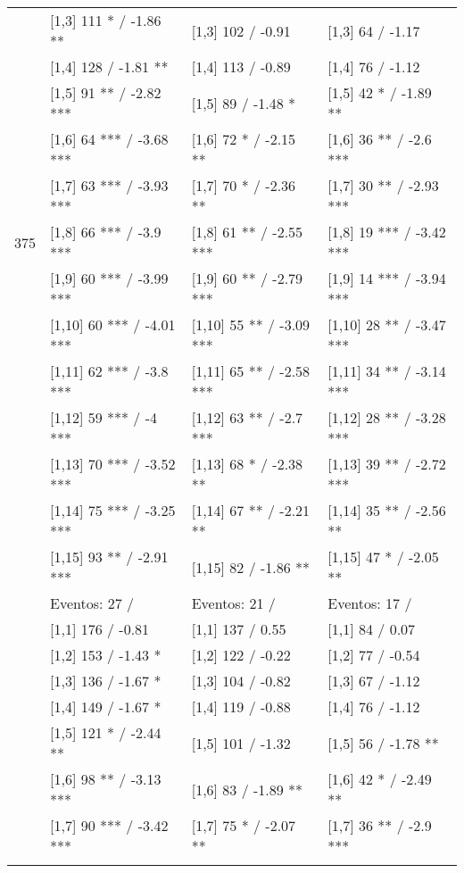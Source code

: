 \begin{table}
\begin{tabular}[t]{llll}
 & {}[1,3] 111 * / -1.86 ** & {}[1,3] 102  / -0.91 & {}[1,3] 64  / -1.17\\
\addlinespace
 & {}[1,4] 128  / -1.81 ** & {}[1,4] 113  / -0.89 & {}[1,4] 76  / -1.12\\
 & {}[1,5] 91 ** / -2.82 *** & {}[1,5] 89  / -1.48 * & {}[1,5] 42 * / -1.89 **\\
 & {}[1,6] 64 *** / -3.68 *** & {}[1,6] 72 * / -2.15 ** & {}[1,6] 36 ** / -2.6 ***\\
 & {}[1,7] 63 *** / -3.93 *** & {}[1,7] 70 * / -2.36 ** & {}[1,7] 30 ** / -2.93 ***\\
375 & {}[1,8] 66 *** / -3.9 *** & {}[1,8] 61 ** / -2.55 *** & {}[1,8] 19 *** / -3.42 ***\\
\addlinespace
 & {}[1,9] 60 *** / -3.99 *** & {}[1,9] 60 ** / -2.79 *** & {}[1,9] 14 *** / -3.94 ***\\
 & {}[1,10] 60 *** / -4.01 *** & {}[1,10] 55 ** / -3.09 *** & {}[1,10] 28 ** / -3.47 ***\\
 & {}[1,11] 62 *** / -3.8 *** & {}[1,11] 65 ** / -2.58 *** & {}[1,11] 34 ** / -3.14 ***\\
 & {}[1,12] 59 *** / -4 *** & {}[1,12] 63 ** / -2.7 *** & {}[1,12] 28 ** / -3.28 ***\\
 & {}[1,13] 70 *** / -3.52 *** & {}[1,13] 68 * / -2.38 ** & {}[1,13] 39 ** / -2.72 ***\\
\addlinespace
 & {}[1,14] 75 *** / -3.25 *** & {}[1,14] 67 ** / -2.21 ** & {}[1,14] 35 ** / -2.56 **\\
 & {}[1,15] 93 ** / -2.91 *** & {}[1,15] 82  / -1.86 ** & {}[1,15] 47 * / -2.05 **\\
 & Eventos:  27 / & Eventos:  21 / & Eventos:  17 /\\
 & {}[1,1] 176  / -0.81 & {}[1,1] 137  / 0.55 & {}[1,1] 84  / 0.07\\
 & {}[1,2] 153  / -1.43 * & {}[1,2] 122  / -0.22 & {}[1,2] 77  / -0.54\\
\addlinespace
 & {}[1,3] 136  / -1.67 * & {}[1,3] 104  / -0.82 & {}[1,3] 67  / -1.12\\
 & {}[1,4] 149  / -1.67 * & {}[1,4] 119  / -0.88 & {}[1,4] 76  / -1.12\\
 & {}[1,5] 121 * / -2.44 ** & {}[1,5] 101  / -1.32 & {}[1,5] 56  / -1.78 **\\
 & {}[1,6] 98 ** / -3.13 *** & {}[1,6] 83  / -1.89 ** & {}[1,6] 42 * / -2.49 **\\
 & {}[1,7] 90 *** / -3.42 *** & {}[1,7] 75 * / -2.07 ** & {}[1,7] 36 ** / -2.9 ***\\
\addlinespace

\end{tabular}
\end{table}
